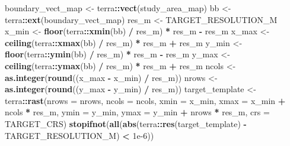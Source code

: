 \documentclass[
]{article}
\newenvironment{Shaded}{\begin{snugshade}}{\end{snugshade}}
\newcommand{\AttributeTok}[1]{\textcolor[rgb]{0.13,0.29,0.53}{#1}}
\newcommand{\FloatTok}[1]{\textcolor[rgb]{0.00,0.00,0.81}{#1}}
\newcommand{\FunctionTok}[1]{\textcolor[rgb]{0.13,0.29,0.53}{\textbf{#1}}}
\newcommand{\NormalTok}[1]{#1}
\newcommand{\OtherTok}[1]{\textcolor[rgb]{0.56,0.35,0.01}{#1}}
\newcommand{\SpecialCharTok}[1]{\textcolor[rgb]{0.81,0.36,0.00}{\textbf{#1}}}
\begin{document}
\begin{Shaded}
\begin{Highlighting}[]
\NormalTok{boundary\_vect\_map }\OtherTok{\textless{}{-}}\NormalTok{ terra}\SpecialCharTok{::}\FunctionTok{vect}\NormalTok{(study\_area\_map)}
\NormalTok{bb }\OtherTok{\textless{}{-}}\NormalTok{ terra}\SpecialCharTok{::}\FunctionTok{ext}\NormalTok{(boundary\_vect\_map)}
\NormalTok{res\_m }\OtherTok{\textless{}{-}}\NormalTok{ TARGET\_RESOLUTION\_M}
\NormalTok{x\_min }\OtherTok{\textless{}{-}} \FunctionTok{floor}\NormalTok{(terra}\SpecialCharTok{::}\FunctionTok{xmin}\NormalTok{(bb) }\SpecialCharTok{/}\NormalTok{ res\_m) }\SpecialCharTok{*}\NormalTok{ res\_m }\SpecialCharTok{{-}}\NormalTok{ res\_m}
\NormalTok{x\_max }\OtherTok{\textless{}{-}} \FunctionTok{ceiling}\NormalTok{(terra}\SpecialCharTok{::}\FunctionTok{xmax}\NormalTok{(bb) }\SpecialCharTok{/}\NormalTok{ res\_m) }\SpecialCharTok{*}\NormalTok{ res\_m }\SpecialCharTok{+}\NormalTok{ res\_m}
\NormalTok{y\_min }\OtherTok{\textless{}{-}} \FunctionTok{floor}\NormalTok{(terra}\SpecialCharTok{::}\FunctionTok{ymin}\NormalTok{(bb) }\SpecialCharTok{/}\NormalTok{ res\_m) }\SpecialCharTok{*}\NormalTok{ res\_m }\SpecialCharTok{{-}}\NormalTok{ res\_m}
\NormalTok{y\_max }\OtherTok{\textless{}{-}} \FunctionTok{ceiling}\NormalTok{(terra}\SpecialCharTok{::}\FunctionTok{ymax}\NormalTok{(bb) }\SpecialCharTok{/}\NormalTok{ res\_m) }\SpecialCharTok{*}\NormalTok{ res\_m }\SpecialCharTok{+}\NormalTok{ res\_m}
\NormalTok{ncols }\OtherTok{\textless{}{-}} \FunctionTok{as.integer}\NormalTok{(}\FunctionTok{round}\NormalTok{((x\_max }\SpecialCharTok{{-}}\NormalTok{ x\_min) }\SpecialCharTok{/}\NormalTok{ res\_m))}
\NormalTok{nrows }\OtherTok{\textless{}{-}} \FunctionTok{as.integer}\NormalTok{(}\FunctionTok{round}\NormalTok{((y\_max }\SpecialCharTok{{-}}\NormalTok{ y\_min) }\SpecialCharTok{/}\NormalTok{ res\_m))}
\NormalTok{target\_template }\OtherTok{\textless{}{-}}\NormalTok{ terra}\SpecialCharTok{::}\FunctionTok{rast}\NormalTok{(}\AttributeTok{nrows =}\NormalTok{ nrows, }\AttributeTok{ncols =}\NormalTok{ ncols,}
                               \AttributeTok{xmin =}\NormalTok{ x\_min, }\AttributeTok{xmax =}\NormalTok{ x\_min }\SpecialCharTok{+}\NormalTok{ ncols }\SpecialCharTok{*}\NormalTok{ res\_m,}
                               \AttributeTok{ymin =}\NormalTok{ y\_min, }\AttributeTok{ymax =}\NormalTok{ y\_min }\SpecialCharTok{+}\NormalTok{ nrows }\SpecialCharTok{*}\NormalTok{ res\_m,}
                               \AttributeTok{crs =}\NormalTok{ TARGET\_CRS)}
\FunctionTok{stopifnot}\NormalTok{(}\FunctionTok{all}\NormalTok{(}\FunctionTok{abs}\NormalTok{(terra}\SpecialCharTok{::}\FunctionTok{res}\NormalTok{(target\_template) }\SpecialCharTok{{-}}\NormalTok{ TARGET\_RESOLUTION\_M) }\SpecialCharTok{\textless{}} \FloatTok{1e{-}6}\NormalTok{))}
\end{Highlighting}
\end{Shaded}
\end{document}
